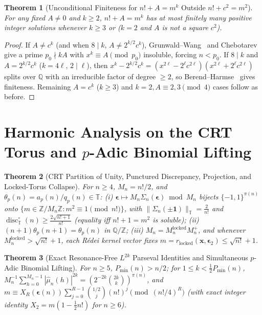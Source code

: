 \documentclass[11pt,reqno]{amsart}
\newtheorem{theorem}{Theorem}[section]
\theoremstyle{remark}
\newcommand{\Z}{\mathbb{Z}}
\newcommand{\Q}{\mathbb{Q}}
\newcommand{\T}{\mathbb{T}}
\newcommand{\disc}{\operatorname{disc}}
\begin{document}
\begin{theorem}[Unconditional Finiteness for $n! + A = m^k$ Outside $n! + c^2 = m^2$]\label{thm:7.5}
For any fixed $A \ne 0$ and $k \ge 2$, $n! + A = m^k$ has at most finitely many positive integer solutions whenever $k \ge 3$ or ($k = 2$ and $A$ is not a square $c^2$).
\end{theorem}
\begin{proof}
If $A \ne c^k$ (and when $8 \mid k$, $A \ne 2^{k/2} c^k$), Grunwald--Wang~\cite[Chapter~10]{ArtinTate2009} and Chebotarev~\cite{Tschebotareff1926} give a prime $p_0 \nmid kA$ with $x^k \equiv A \pmod{p_0}$ insoluble, forcing $n < p_0$. If $8 \mid k$ and $A = 2^{k/2} c^k$ ($k = 4\ell$, $2 \mid \ell$), then $x^k - 2^{k/2} c^k = (x^{2\ell} - 2^\ell c^{2\ell})(x^{2\ell} + 2^\ell c^{2\ell})$ splits over $\Q$ with an irreducible factor of degree $\ge 2$, so Berend--Harmse~\cite[Theorem~1.1]{BerendHarmse2006} gives finiteness. Remaining $A = c^k$ ($k \ge 3$) and $k = 2, A \equiv 2,3 \pmod 4$ cases follow as before.
\end{proof}

\section{Harmonic Analysis on the CRT Torus and $p$-Adic Binomial Lifting}

\begin{theorem}[CRT Partition of Unity, Punctured Discrepancy, Projection, and Locked-Torus Collapse]\label{thm:8.1}
For $n \ge 4$, $M_n = n!/2$, and $\theta_p(n) = a_p(n)/q_p(n) \in \T$:
(i) $\boldsymbol{\epsilon} \mapsto M_n \Sigma_n(\boldsymbol{\epsilon}) \bmod M_n$ bijects $\{-1, 1\}^{\pi(n)}$ onto $\{m \in \Z/M_n\Z : m^2 \equiv 1 \pmod{n!}\}$, with $\|\Sigma_n(\pm \mathbf{1})\|_\T = \frac{2}{n!}$ and $\disc^\circ_\T(n) \ge \frac{2\sqrt{n!+1}}{n!}$ (equality iff $n! + 1 = m^2$ is soluble);
(ii) $(n+1)\theta_p(n+1) = \theta_p(n)$ in $\Q/\Z$;
(iii) $M_n = M_n^{\mathrm{locked}} M_n^+$, and whenever $M_n^{\mathrm{locked}} > \sqrt{n!}+1$, each R\'edei kernel vector fixes $m = r_{\mathrm{locked}}(\mathbf{x}, \boldsymbol{\epsilon}_2) \le \sqrt{n!}+1$.
\end{theorem}

\begin{theorem}[Exact Resonance-Free $L^{2k}$ Parseval Identities and Simultaneous $p$-Adic Binomial Lifting]\label{thm:8.2}
For $n \ge 5$, $P_{\min}(n) > n/2$; for $1 \le k < \frac{1}{2}P_{\min}(n)$, $M_n^{-1}\sum_{h=0}^{M_n-1} |\hat{\mu}_n(h)|^{2k} = (2^{-2k}\binom{2k}{k})^{\pi(n)}$, and $m \equiv X_R(\boldsymbol{\epsilon}(n))\sum_{j=0}^{R-1}\binom{1/2}{j}(n!)^j \pmod{(n!/4)^R}$ (with exact integer identity $X_2 = m(1 - \frac{1}{2}n!)$ for $n \ge 6$).
\end{theorem}
\end{document}
